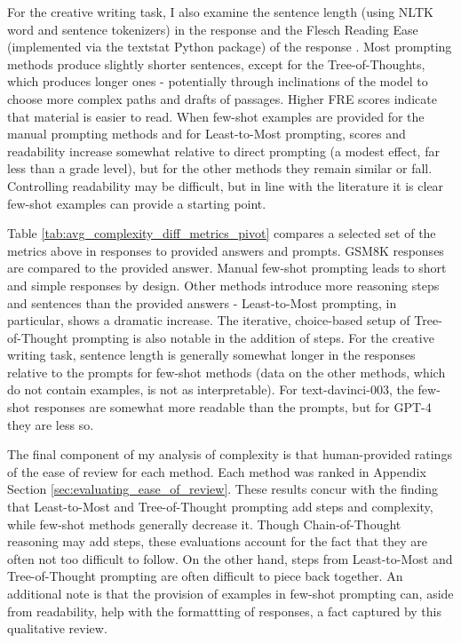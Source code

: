 \documentclass[11pt]{article}
\begin{document}
For the creative writing task, I also examine the sentence length (using NLTK word and sentence tokenizers) in the response and the Flesch Reading Ease (implemented via the textstat Python package) of the response \cite{flesch_how_2016, aggarwal_textstat_nodate}. Most prompting methods produce slightly shorter sentences, except for the Tree-of-Thoughts, which produces longer ones - potentially through inclinations of the model to choose more complex paths and drafts of passages. Higher FRE scores indicate that material is easier to read. When few-shot examples are provided for the manual prompting methods and for Least-to-Most prompting, scores and readability increase somewhat relative to direct prompting (a modest effect, far less than a grade level), but for the other methods they remain similar or fall. Controlling readability may be difficult, but in line with the literature it is clear few-shot examples can provide a starting point. \cite{imperial_flesch_2023}

Table \ref{tab:avg_complexity_diff_metrics_pivot} compares a selected set of the metrics above in responses to provided answers and prompts. GSM8K responses are compared to the provided answer. Manual few-shot prompting leads to short and simple responses by design. Other methods introduce more reasoning steps and sentences than the provided answers - Least-to-Most prompting, in particular, shows a dramatic increase. The iterative, choice-based setup of Tree-of-Thought prompting is also notable in the addition of steps. For the creative writing task, sentence length is generally somewhat longer in the responses relative to the prompts for few-shot methods (data on the other methods, which do not contain examples, is not as interpretable). For text-davinci-003, the few-shot responses are somewhat more readable than the prompts, but for GPT-4 they are less so.

The final component of my analysis of complexity is that human-provided ratings of the ease of review for each method. Each method was ranked in Appendix Section \ref{sec:evaluating_ease_of_review}. These results concur with the finding that Least-to-Most and Tree-of-Thought prompting add steps and complexity, while few-shot methods generally decrease it. Though Chain-of-Thought reasoning may add steps, these evaluations account for the fact that they are often not too difficult to follow. On the other hand, steps from Least-to-Most and Tree-of-Thought prompting are often difficult to piece back together. An additional note is that the provision of examples in few-shot prompting can, aside from readability, help with the formattting of responses, a fact captured by this qualitative review.
\end{document}
